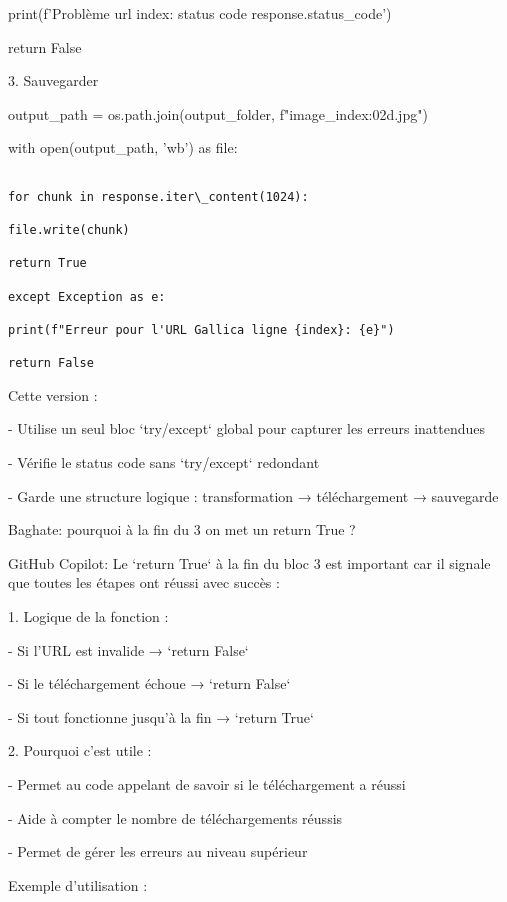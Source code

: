 print(f'Problème url {index}: status code {response.status\_code}')

return False

  3. Sauvegarder

output\_path = os.path.join(output\_folder, f"image\_{index:02d}.jpg")

with open(output\_path, 'wb') as file:

\begin{verbatim}

for chunk in response.iter\_content(1024):

file.write(chunk)

return True

except Exception as e:

print(f"Erreur pour l'URL Gallica ligne {index}: {e}")

return False

\end{verbatim}

Cette version :

- Utilise un seul bloc `try/except` global pour capturer les erreurs inattendues

- Vérifie le status code sans `try/except` redondant

- Garde une structure logique : transformation → téléchargement → sauvegarde

Baghate: pourquoi à la fin du  3 on met un return True ?

GitHub Copilot: Le `return True` à la fin du bloc  3 est important car il signale que toutes les étapes ont réussi avec succès :

1. Logique de la fonction :

- Si l'URL est invalide → `return False`

- Si le téléchargement échoue → `return False`

- Si tout fonctionne jusqu'à la fin → `return True`

2. Pourquoi c'est utile :

- Permet au code appelant de savoir si le téléchargement a réussi

- Aide à compter le nombre de téléchargements réussis

- Permet de gérer les erreurs au niveau supérieur

Exemple d'utilisation :

\begin{verbatim}

\end{verbatim}

